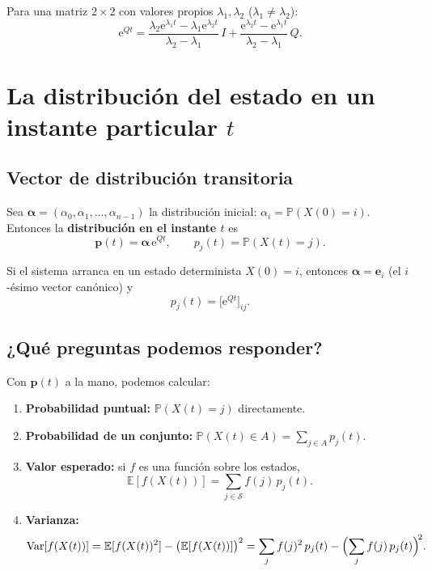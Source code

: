 \documentclass[11pt,a4paper]{article}
\theoremstyle{definition}
\theoremstyle{remark}
\newcommand{\E}{\mathbb{E}}
\newcommand{\Var}{\mathrm{Var}}
\newcommand{\Prob}{\mathbb{P}}
\newcommand{\e}{\mathrm{e}}
\begin{document}
Para una matriz $2\times 2$ con valores propios $\lambda_1, \lambda_2$
($\lambda_1 \ne \lambda_2$):
\[
  \e^{Qt} = \frac{\lambda_2\e^{\lambda_1 t}-\lambda_1\e^{\lambda_2 t}}
                  {\lambda_2-\lambda_1}\,I
           +\frac{\e^{\lambda_2 t}-\e^{\lambda_1 t}}
                  {\lambda_2-\lambda_1}\,Q.
\]

\section{La distribución del estado en un instante particular \texorpdfstring{$t$}{t}}

\subsection{Vector de distribución transitoria}

Sea $\boldsymbol{\alpha} = (\alpha_0,\alpha_1,\dots,\alpha_{n-1})$ la
distribución inicial: $\alpha_i = \Prob(X(0)=i)$.  Entonces la
\textbf{distribución en el instante $t$} es
\[
  \boldsymbol{p}(t) = \boldsymbol{\alpha}\,\e^{Qt},
  \qquad p_j(t) = \Prob(X(t) = j).
\]

Si el sistema arranca en un estado determinista $X(0)=i$, entonces
$\boldsymbol{\alpha} = \mathbf{e}_i$ (el $i$-ésimo vector canónico) y
\[
  p_j(t) = \bigl[\e^{Qt}\bigr]_{ij}.
\]

\subsection{¿Qué preguntas podemos responder?}

Con $\boldsymbol{p}(t)$ a la mano, podemos calcular:

\begin{enumerate}
  \item \textbf{Probabilidad puntual:} $\Prob(X(t)=j)$ directamente.
  \item \textbf{Probabilidad de un conjunto:}
    $\Prob(X(t)\in A) = \sum_{j\in A} p_j(t)$.
  \item \textbf{Valor esperado:} si $f$ es una función sobre los estados,
    \[
      \E[f(X(t))] = \sum_{j\in\mathcal{S}} f(j)\,p_j(t).
    \]
  \item \textbf{Varianza:}
    \[
      \Var[f(X(t))] = \E[f(X(t))^2] - \bigl(\E[f(X(t))]\bigr)^2
      = \sum_j f(j)^2\,p_j(t) - \Bigl(\sum_j f(j)\,p_j(t)\Bigr)^{\!2}.
    \]
\end{enumerate}
\end{document}
